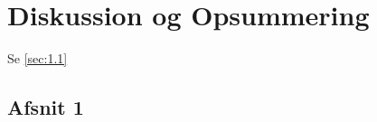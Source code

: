 \chapter{Diskussion og Opsummering}
\label{Ch:5}

Se \vref{sec:1.1}

\lipsum*

\section{Afsnit 1}
\label{sec:1.1}

\lipsum*